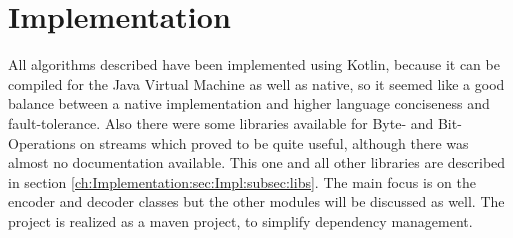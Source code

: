 \chapter{Implementation}
\label{ch:Implementation}
All algorithms described have been implemented using Kotlin, because it can be compiled for the Java Virtual Machine as well as native, so it seemed like a good balance between a native implementation and higher language conciseness and fault-tolerance. Also there were some libraries available for Byte- and Bit-Operations on streams which proved to be quite useful, although there was almost no documentation available. This one and all other libraries are described in section \ref{ch:Implementation:sec:Impl:subsec:libs}. The main focus is on the encoder and decoder classes but the other modules will be discussed as well. The project is realized as a maven project, to simplify dependency management. 

